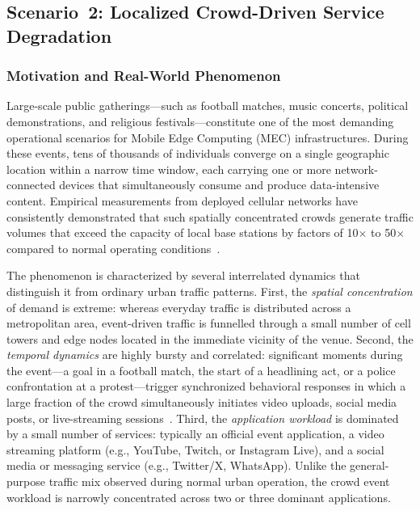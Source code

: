 
\subsection{Scenario~2: Localized Crowd-Driven Service Degradation}
\label{sec:scenario_crowd_event}

\subsubsection{Motivation and Real-World Phenomenon}

Large-scale public gatherings---such as football matches, music concerts, political demonstrations, and religious festivals---constitute one of the most demanding operational scenarios for Mobile Edge Computing (MEC) infrastructures. During these events, tens of thousands of individuals converge on a single geographic location within a narrow time window, each carrying one or more network-connected devices that simultaneously consume and produce data-intensive content. Empirical measurements from deployed cellular networks have consistently demonstrated that such spatially concentrated crowds generate traffic volumes that exceed the capacity of local base stations by factors of 10$\times$ to 50$\times$ compared to normal operating conditions~\cite{Pujol2015Understanding, Shafiq2013First, Zhang2022Optimal}.

The phenomenon is characterized by several interrelated dynamics that distinguish it from ordinary urban traffic patterns. First, the \emph{spatial concentration} of demand is extreme: whereas everyday traffic is distributed across a metropolitan area, event-driven traffic is funnelled through a small number of cell towers and edge nodes located in the immediate vicinity of the venue. Second, the \emph{temporal dynamics} are highly bursty and correlated: significant moments during the event---a goal in a football match, the start of a headlining act, or a police confrontation at a protest---trigger synchronized behavioral responses in which a large fraction of the crowd simultaneously initiates video uploads, social media posts, or live-streaming sessions~\cite{Crane2008Robust}. Third, the \emph{application workload} is dominated by a small number of services: typically an official event application, a video streaming platform (e.g., YouTube, Twitch, or Instagram Live), and a social media or messaging service (e.g., Twitter/X, WhatsApp). Unlike the general-purpose traffic mix observed during normal urban operation, the crowd event workload is narrowly concentrated across two or three dominant applications.

